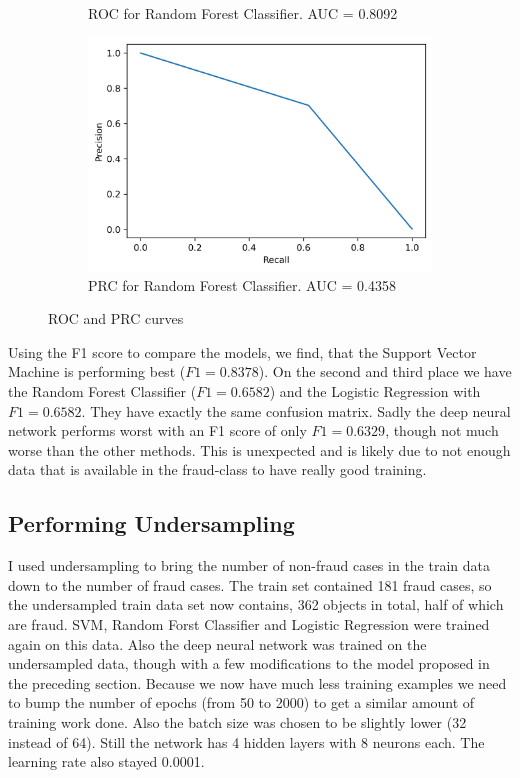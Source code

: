 \documentclass[utf8x]{ctexart}
\begin{document}
\begin{figure}[htb]
\begin{subfigure}[b]{0.48\textwidth}
    \caption{ROC for Random Forest Classifier. AUC = 0.8092}
    \label{fig:rfc_roc}
  \end{subfigure}
  \begin{subfigure}[b]{0.48\textwidth}
    \centering
    \includegraphics[width=\textwidth]{./images/rfc_prc.png}
    \caption{PRC for Random Forest Classifier. AUC = 0.4358}
    \label{fig:rfc_prc}
  \end{subfigure}
  \caption{ROC and PRC curves}
  \label{fig:roc_and_prc}
\end{figure}

Using the F1 score to compare the models, we find, that the Support Vector Machine is performing best ($F1 = 0.8378$). On the second and third place we have the Random Forest Classifier ($F1 = 0.6582$) and the Logistic Regression with $F1 = 0.6582$. They have exactly the same confusion matrix. Sadly the deep neural network performs worst with an F1 score of only $F1 = 0.6329$, though not much worse than the other methods. This is unexpected and is likely due to not enough data that is available in the fraud-class to have really good training.

\subsection{Performing Undersampling}

I used undersampling to bring the number of non-fraud cases in the train data down to the number of fraud cases. The train set contained 181 fraud cases, so the undersampled train data set now contains, 362 objects in total, half of which are fraud. SVM, Random Forst Classifier and Logistic Regression were trained again on this data. Also the deep neural network was trained on the undersampled data, though with a few modifications to the model proposed in the preceding section.
Because we now have much less training examples we need to bump the number of epochs (from 50 to 2000) to get a similar amount of training work done. Also the batch size was chosen to be slightly lower (32 instead of 64). Still the network has 4 hidden layers with 8 neurons each. The learning rate also stayed 0.0001.
\end{document}
